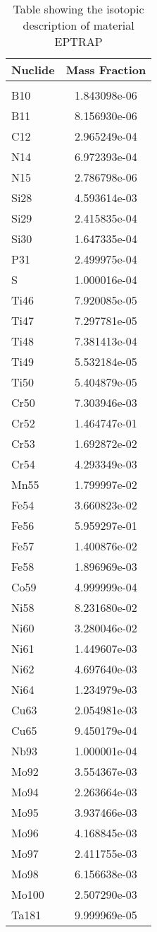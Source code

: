 \begin{centering}
\begin{table}[ht!]
\begin{tabular}{l | c}
\hline
Nuclide & Mass Fraction\\
\hline
\\
B10 & 1.843098e-06\\
B11 & 8.156930e-06\\
C12 & 2.965249e-04\\
N14 & 6.972393e-04\\
N15 & 2.786798e-06\\
Si28 & 4.593614e-03\\
Si29 & 2.415835e-04\\
Si30 & 1.647335e-04\\
P31 & 2.499975e-04\\
S & 1.000016e-04\\
Ti46 & 7.920085e-05\\
Ti47 & 7.297781e-05\\
Ti48 & 7.381413e-04\\
Ti49 & 5.532184e-05\\
Ti50 & 5.404879e-05\\
Cr50 & 7.303946e-03\\
Cr52 & 1.464747e-01\\
Cr53 & 1.692872e-02\\
Cr54 & 4.293349e-03\\
Mn55 & 1.799997e-02\\
Fe54 & 3.660823e-02\\
Fe56 & 5.959297e-01\\
Fe57 & 1.400876e-02\\
Fe58 & 1.896969e-03\\
Co59 & 4.999999e-04\\
Ni58 & 8.231680e-02\\
Ni60 & 3.280046e-02\\
Ni61 & 1.449607e-03\\
Ni62 & 4.697640e-03\\
Ni64 & 1.234979e-03\\
Cu63 & 2.054981e-03\\
Cu65 & 9.450179e-04\\
Nb93 & 1.000001e-04\\
Mo92 & 3.554367e-03\\
Mo94 & 2.263664e-03\\
Mo95 & 3.937466e-03\\
Mo96 & 4.168845e-03\\
Mo97 & 2.411755e-03\\
Mo98 & 6.156638e-03\\
Mo100 & 2.507290e-03\\
Ta181 & 9.999969e-05
\end{tabular}
\caption{Table showing the isotopic description of material EPTRAP}
\label{table:material_EPTRAP}
\end{table}\clearpage


\end{centering}
